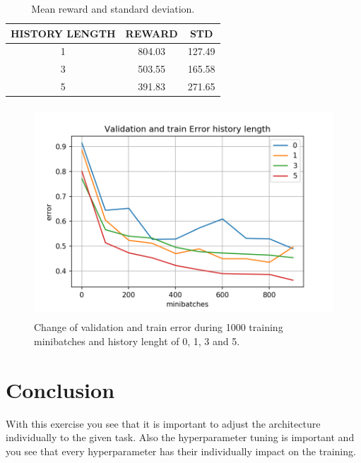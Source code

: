 \documentclass[a4paper,12pt]{article}
\begin{document}
\begin{table}[h] 
	\centering
	\begin{tabular}{|c |c | c|} 
		\hline
		\bfseries{HISTORY LENGTH} & \bfseries{REWARD} & \bfseries{STD} \\ 
		\hline\hline
		1 & 804.03 & 127.49 \\ 
		
		3 & 503.55 & 165.58\\
		
		5 & 391.83 & 271.65\\ 
		\hline
	\end{tabular}
	\caption{\label{tab:hist} Mean reward and standard deviation.}
\end{table}

\begin{figure}[H]
	\centering \includegraphics[width=11.70cm, height=7.9cm]{plots/valid_error_hist.png}
	\caption{
		\label{fig:hist}
		Change of validation and train error during 1000 training minibatches and history lenght of 0, 1, 3 and 5.
	}
\end{figure}



\section{Conclusion}
With this exercise you see that it is important to adjust the architecture individually to the given task. Also the hyperparameter tuning is important and you see that every hyperparameter has their individually impact on the training.


\end{document}
